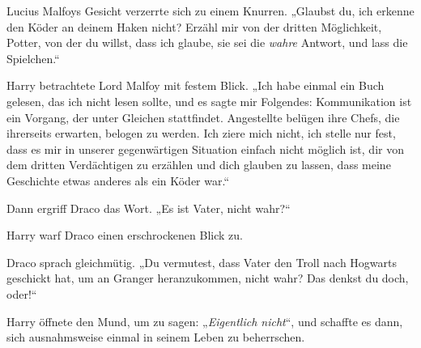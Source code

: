 Lucius Malfoys Gesicht verzerrte sich zu einem Knurren.
„Glaubst du, ich erkenne den Köder an deinem Haken nicht? Erzähl mir von der dritten Möglichkeit, Potter, von der du willst, dass ich glaube, sie sei die \emph{wahre} Antwort, und lass die Spielchen.“

Harry betrachtete Lord Malfoy mit festem Blick.
„Ich habe einmal ein Buch gelesen, das ich nicht lesen sollte, und es sagte mir Folgendes: Kommunikation ist ein Vorgang, der unter Gleichen stattfindet. Angestellte belügen ihre Chefs, die ihrerseits erwarten, belogen zu werden. Ich ziere mich nicht, ich stelle nur fest, dass es mir in unserer gegenwärtigen Situation einfach nicht möglich ist, dir von dem dritten Verdächtigen zu erzählen und dich glauben zu lassen, dass meine Geschichte etwas anderes als ein Köder war.“

Dann ergriff Draco das Wort.
„Es ist Vater, nicht wahr?“

Harry warf Draco einen erschrockenen Blick zu.

Draco sprach gleichmütig.
„Du vermutest, dass Vater den Troll nach Hogwarts geschickt hat, um an Granger heranzukommen, nicht wahr? Das denkst du doch, oder!“

Harry öffnete den Mund, um zu sagen:
„\emph{Eigentlich nicht}“, und schaffte es dann, sich ausnahmsweise einmal in seinem Leben zu beherrschen.

